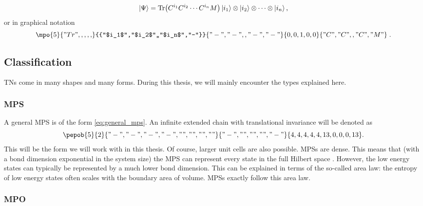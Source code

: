 \begin{equation}
  \ket{\Psi} = \Tr( C^{i_1} C^{i_2} \cdots C^{i_n} M  ) \ket{i_1} \otimes \ket{i_2} \otimes \cdots \otimes \ket{i_n},
\end{equation}
or in graphical notation
\begin{equation}\label{eq:general_mps}
  \mpo{5}{{"Tr",,,,,}}{{"$i_1$","$i_2$",,"$i_n$","-"}}{{"-","-",,"-","-"}}{{0,0,1,0,0}}{{"C", "C",,"C","M" }} \; .
\end{equation}

\subsection{Classification}

\Glspl{TN} come in many shapes and many forms. During this thesis, we will mainly encounter the types explained here.

\subsubsection{ MPS}

A general \gls{MPS} is of the form \cref{eq:general_mps}. An infinite extended chain with translational invariance will be denoted as
\begin{equation}\label{mps:uni}
  \pepob{5}{2}{{
        "-","-", "-","-",
        "","","",""}}{{
        "-",
        "",
        "",
        "",
        "-"}}{{
        4,4,4,4,4,
        13,0,0,0,13}} .
\end{equation}
This will be the form we will work with in this thesis. Of course, larger unit cells are also possible. \Glspl{MPS} are dense. This means that (with a bond dimension exponential in the system size) the \Gls{MPS} can represent every state in the full Hilbert space \cite{Orus2014}. However, the low energy states can typically be represented by a much lower bond dimension. This can be explained in terms of the so-called area law: the entropy of low energy states often scales with the boundary area of volume. \Glspl{MPS} exactly follow this area law.

\subsubsection{ MPO} \label{mpo_hamil}

